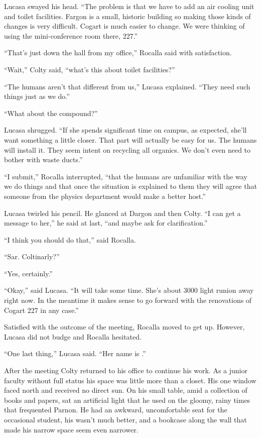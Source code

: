 Lucasa swayed his head. ``The problem is that we have to add an air cooling unit and toilet
facilities. Fargon is a small, historic building so making those kinds of changes is very
difficult. Cogart is much easier to change. We were thinking of using the mini-conference room
there, 227.''

``That's just down the hall from my office,'' Rocalla said with satisfaction.

``Wait,'' Colty said, ``what's this about toilet facilities?''

``The humans aren't that different from us,'' Lucasa explained. ``They need such things just as
we do.''

``What about the compound?''

Lucasa shrugged. ``If she spends significant time on campus, as expected, she'll want something
a little closer. That part will actually be easy for us. The humans will install it. They seem
intent on recycling all organics. We don't even need to bother with waste ducts.''

``I submit,'' Rocalla interrupted, ``that the humans are unfamiliar with the way we do things
and that once the situation is explained to them they will agree that someone from the physics
department would make a better host.''

Lucasa twirled his pencil. He glanced at Dargon and then Colty. ``I can get a message to her,''
he said at last, ``and maybe ask for clarification.''

``I think you should do that,'' said Rocalla.

``Sar. Coltinarly?''

``Yes, certainly.''

``Okay,'' said Lucasa. ``It will take some time. She's about 3000 light runion away right now.
In the meantime it makes sense to go forward with the renovations of Cogart 227 in any case.''

Satisfied with the outcome of the meeting, Rocalla moved to get up. However, Lucasa did not
budge and Rocalla hesitated.

``One last thing,'' Lucasa said. ``Her name is .''

\spacebreak

After the meeting Colty returned to his office to continue his work. As a junior faculty without
full status his space was little more than a closet. His one window faced north and received no
direct sun. On his small table, amid a collection of books and papers, sat an artificial light
that he used on the gloomy, rainy times that frequented Parnon. He had an awkward, uncomfortable
seat for the occasional student, his wasn't much better, and a bookcase along the wall that made
his narrow space seem even narrower.

